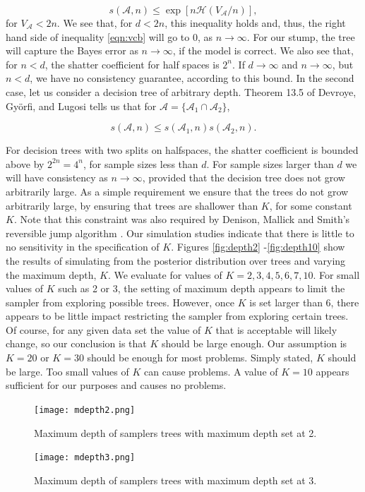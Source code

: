 \begin{equation} 
s(\mathcal{A},n)\leq \exp[n\mathcal{H}(V_\mathcal{A}/n)],
\end{equation}
 for $V_\mathcal{A} < 2n$. We see that, for $d<2n$, this inequality holds and, thus, the right hand side of inequality \ref{eqn:vcb} will go to $0$, as $n\to\infty$. For our stump, the tree will capture the Bayes error as $n\to\infty$, if the model is correct. We also see that, for $n<d$, the shatter coefficient for half spaces is $2^n$. If $d\to\infty$ and $n\to\infty$, but $n<d$, we have no consistency guarantee, according to this bound.  In the second case, let us consider a decision tree of arbitrary depth. Theorem 13.5 of Devroye, Gy\"{o}rfi, and Lugosi tells us that for $\mathcal{A} =\{ \mathcal{A}_1 \cap \mathcal{A}_2\}$, 

 \begin{equation}
  s(\mathcal{A},n) \leq s(\mathcal{A}_1,n)s(\mathcal{A}_2,n).
\end{equation}

For decision trees with two splits on halfspaces, the shatter coefficient is bounded above by $2^{2n}=4^n$, for sample sizes less than $d$. For sample sizes larger than $d$ we will have consistency as $n\to\infty$, provided that the decision tree does not grow arbitrarily large. As a simple requirement we ensure that the trees do not grow arbitrarily large, by ensuring that trees are shallower than $K$, for some constant $K$. Note that this constraint was also required by Denison, Mallick and Smith's reversible jump algorithm \cite{denison1998bayesian}. Our simulation studies indicate that there is little to no sensitivity in the specification of $K$. Figures \ref{fig:depth2} -\ref{fig:depth10} show the results of simulating from the posterior distribution over trees and varying the maximum depth, $K$. We evaluate for values of $K=2,3,4,5,6,7,10$. For small values of $K$ such as 2 or 3, the setting of maximum depth appears to limit the sampler from exploring possible trees.  However, once $K$ is set larger than 6, there appears to be little impact restricting the sampler from exploring certain trees. Of course, for any given data set the value of $K$ that is acceptable will likely change, so our conclusion is that $K$ should be large enough. Our assumption is $K=20$ or $K=30$ should be enough for most problems. Simply stated, $K$ should be large. Too small values of $K$ can cause problems. A value of $K=10$ appears sufficient for our purposes and causes no problems. 

  \begin{figure}[h]
  \centering
  \texttt{[image: mdepth2.png]}
  \caption[Maximum depth of samplers trees with maximum depth set at 2.]{Maximum depth of samplers trees with maximum depth set at 2.}\label{fig:depth2}
\endminipage\hfill
{}%
\hspace{-1cm}
 \texttt{[image: mdepth3.png]}
  \caption[Maximum depth of samplers trees with maximum depth set at 3.]{Maximum depth of samplers trees with maximum depth set at 3.}\label{fig:depth3}
\endminipage
\end{figure}

